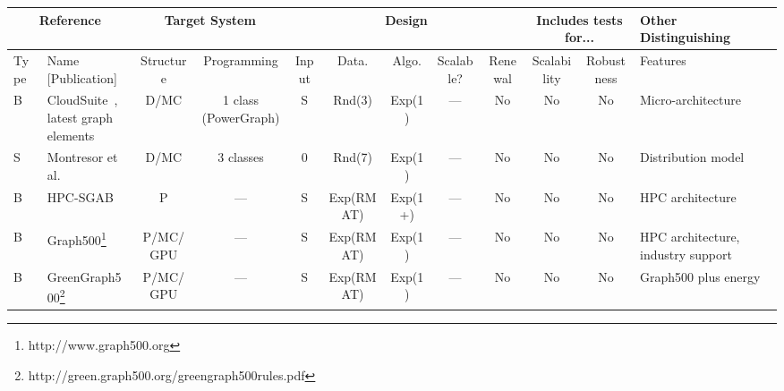 \begin{tabular}[!tb]{|l|l|l|l|l|l|l|l|l|l|l|l|}
\hline
\multicolumn{2}{|c|}{Reference} & \multicolumn{2}{c|}{Target System} & \multicolumn{5}{c|}{Design} & \multicolumn{2}{c|}{Includes tests for...} & Other Distinguishing \\ 
\hline
Type & Name [Publication] & \multicolumn{1}{c|}{Structure} & \multicolumn{1}{c|}{Programming} & \multicolumn{1}{c|}{Input} & \multicolumn{1}{c|}{Data.} & \multicolumn{1}{c|}{Algo.} & \multicolumn{1}{c|}{Scalable?} & \multicolumn{1}{c|}{Renewal} & \multicolumn{1}{c|}{Scalability} & \multicolumn{1}{c|}{Robustness} & Features \\ 
\hline
B & \pbox{5cm}{CloudSuite~\cite{DBLP:conf/asplos/FerdmanAKVAJKPAF12 }, \\latest graph elements} & \multicolumn{1}{c|}{D/MC} & \multicolumn{1}{c|}{1 class (PowerGraph)} & \multicolumn{1}{c|}{S} & \multicolumn{1}{c|}{Rnd(3)} & \multicolumn{1}{c|}{Exp(1)} & \multicolumn{1}{c|}{---} & \multicolumn{1}{c|}{No} & \multicolumn{1}{c|}{No} & \multicolumn{1}{c|}{No} & Micro-architecture \\ 
\hline
S & Montresor et al.~\cite{DBLP:conf/bigdataconf/ElserM13} & \multicolumn{1}{c|}{D/MC} & \multicolumn{1}{c|}{3 classes} & \multicolumn{1}{c|}{0} & \multicolumn{1}{c|}{Rnd(7)} & \multicolumn{1}{c|}{Exp(1)} & \multicolumn{1}{c|}{---} & \multicolumn{1}{c|}{No} & \multicolumn{1}{c|}{No} & \multicolumn{1}{c|}{No} & Distribution model \\ 
\hline
B & HPC-SGAB~\cite{DBLP:conf/hipc/BaderM05} & \multicolumn{1}{c|}{P} & \multicolumn{1}{c|}{---} & \multicolumn{1}{c|}{S} & \multicolumn{1}{c|}{Exp(RMAT)} & \multicolumn{1}{c|}{Exp(1+)} & \multicolumn{1}{c|}{---} & \multicolumn{1}{c|}{No} & \multicolumn{1}{c|}{No} & \multicolumn{1}{c|}{No} & HPC architecture \\ 
\hline
B & Graph500\footnote{http://www.graph500.org} & \multicolumn{1}{c|}{P/MC/GPU} & \multicolumn{1}{c|}{---} & \multicolumn{1}{c|}{S} & \multicolumn{1}{c|}{Exp(RMAT)} & \multicolumn{1}{c|}{Exp(1)} & \multicolumn{1}{c|}{---} & \multicolumn{1}{c|}{No} & \multicolumn{1}{c|}{No} & \multicolumn{1}{c|}{No} & HPC architecture, industry support \\ 
\hline
B & GreenGraph500\footnote{http://green.graph500.org/greengraph500rules.pdf} & \multicolumn{1}{c|}{P/MC/GPU} & \multicolumn{1}{c|}{---} & \multicolumn{1}{c|}{S} & \multicolumn{1}{c|}{Exp(RMAT)} & \multicolumn{1}{c|}{Exp(1)} & \multicolumn{1}{c|}{---} & \multicolumn{1}{c|}{No} & \multicolumn{1}{c|}{No} & \multicolumn{1}{c|}{No} & Graph500 plus energy \\ 

\end{tabular}
